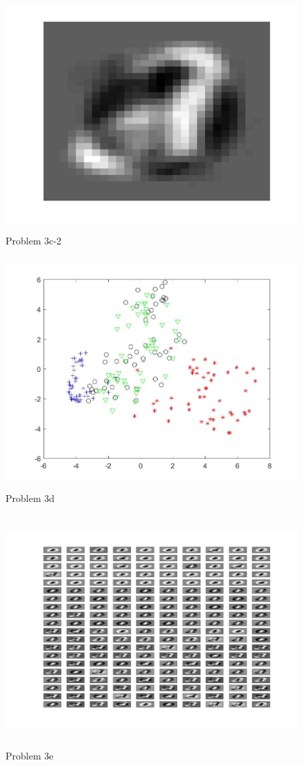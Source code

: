 \documentclass[11pt]{scrartcl}
\begin{document}
\begin{figure} 

	\includegraphics[width=5.5in,height=3.5in]{digit_image_3c2.jpg}
	\caption{Problem 3c-2}
\end{figure}
\begin{figure} 

	\includegraphics[width=5.5in,height=3.5in]{digit_image_3d.jpg}
	\caption{Problem 3d}
\end{figure}
\begin{figure} 

	\includegraphics[width=5.5in,height=3.5in]{digit_image_3e.jpg}
	\caption{Problem 3e}
\end{figure}
\end{document}
